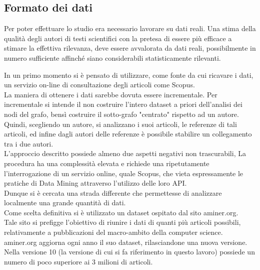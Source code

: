 \documentclass[a4paper, 12pt]{article}
\begin{document}
\subsection{Formato dei dati}
Per poter effettuare lo studio era necessario lavorare su dati reali. Una stima della qualità degli autori di testi scientifici con la pretesa di essere più efficace a stimare la effettiva rilevanza, deve essere avvalorata da dati reali, possibilmente in numero sufficiente affinché siano considerabili statisticamente rilevanti.
\par
In un primo momento si è pensato di utilizzare, come fonte da cui ricavare i dati, un servizio on-line di consultazione degli articoli come Scopus. \\ 
La maniera di ottenere i dati sarebbe dovuta essere incrementale.
Per incrementale si intende il non costruire l'intero dataset a priori dell'analisi dei nodi del grafo, bensì costruire il sotto-grafo "centrato" rispetto ad un autore.
Quindi, scegliendo un autore, si analizzano i suoi articoli, le referenze di tali articoli, ed infine dagli autori delle referenze è possibile stabilire un collegamento tra i due autori. \\
L'approccio descritto possiede almeno due aspetti negativi non trascurabili,
La procedura ha una complessità elevata e richiede una ripetutamente l'interrogazione di un servizio online, quale Scopus, che vieta espressamente le pratiche di Data Mining attraverso l'utilizzo delle loro API. \\
Dunque si è cercata una strada differente che permettesse di analizzare localmente una grande quantità di dati. \\
Come scelta definitiva si è utilizzato un dataset ospitato dal sito aminer.org. \\
Tale sito si prefigge l'obiettivo di riunire i dati di quanti più articoli possibili, relativamente a pubblicazioni del macro-ambito della computer science.
aminer.org aggiorna ogni anno il suo dataset, rilasciandone una nuova versione. Nella versione 10 (la versione di cui si fa riferimento in questo lavoro) possiede un numero di poco superiore ai 3 milioni di articoli. \\
\end{document}
